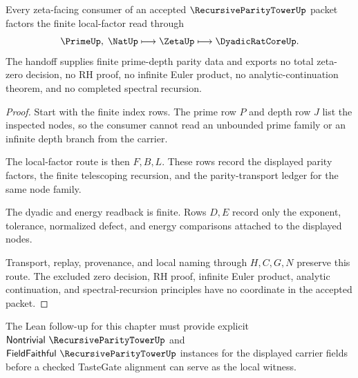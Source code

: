 \begin{theorem}
\label{thm:recursive-parity-tower-local-factor-handoff}
Every zeta-facing consumer of an accepted $\RecursiveParityTowerUp$ packet factors the finite local-factor read through
$$
\PrimeUp,\;\NatUp
\longmapsto
\ZetaUp
\longmapsto
\DyadicRatCoreUp .
$$
The handoff supplies finite prime-depth parity data and exports no total zeta-zero decision, no RH proof, no infinite Euler product, no analytic-continuation theorem, and no completed spectral recursion.
\end{theorem}
\begin{proof}
Start with the finite index rows. The prime row $P$ and depth row $J$ list the inspected nodes, so the consumer cannot read an unbounded prime family or an infinite depth branch from the carrier.

The local-factor route is then $F,B,L$. These rows record the displayed parity factors, the finite telescoping recursion, and the parity-transport ledger for the same node family.

The dyadic and energy readback is finite. Rows $D,E$ record only the exponent, tolerance, normalized defect, and energy comparisons attached to the displayed nodes.

Transport, replay, provenance, and local naming through $H,C,G,N$ preserve this route. The excluded zero decision, RH proof, infinite Euler product, analytic continuation, and spectral-recursion principles have no coordinate in the accepted packet.
\end{proof}



The Lean follow-up for this chapter must provide explicit $\mathsf{Nontrivial}\ \RecursiveParityTowerUp$ and $\mathsf{FieldFaithful}\ \RecursiveParityTowerUp$ instances for the displayed carrier fields before a checked TasteGate alignment can serve as the local witness.

